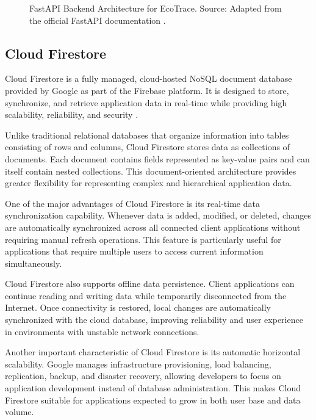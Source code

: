 \begin{figure}[H]
  \centering
  \caption{FastAPI Backend Architecture for EcoTrace. Source: Adapted from the official FastAPI documentation \citep{ramirez2025}.}
  \label{fig:fastapi-arch}
\end{figure}

\subsection{Cloud Firestore}

Cloud Firestore is a fully managed, cloud-hosted NoSQL document database
provided by Google as part of the Firebase platform. It is designed to store,
synchronize, and retrieve application data in real-time while providing high
scalability, reliability, and security \citep{firebase2025firestore}.

Unlike traditional relational databases that organize information into tables
consisting of rows and columns, Cloud Firestore stores data as collections of
documents. Each document contains fields represented as key-value pairs and can
itself contain nested collections. This document-oriented architecture provides
greater flexibility for representing complex and hierarchical application data.

One of the major advantages of Cloud Firestore is its real-time data
synchronization capability. Whenever data is added, modified, or deleted, changes
are automatically synchronized across all connected client applications without
requiring manual refresh operations. This feature is particularly useful for
applications that require multiple users to access current information
simultaneously.

Cloud Firestore also supports offline data persistence. Client applications can
continue reading and writing data while temporarily disconnected from the
Internet. Once connectivity is restored, local changes are automatically
synchronized with the cloud database, improving reliability and user experience in
environments with unstable network connections.

Another important characteristic of Cloud Firestore is its automatic horizontal
scalability. Google manages infrastructure provisioning, load balancing,
replication, backup, and disaster recovery, allowing developers to focus on
application development instead of database administration. This makes Cloud
Firestore suitable for applications expected to grow in both user base and data
volume.

